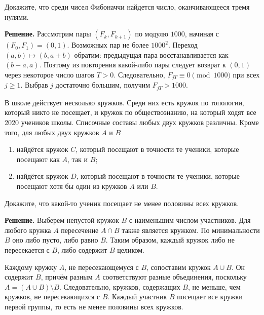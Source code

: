 \begin{problems}
\item Докажите, что среди чисел Фибоначчи найдется число, оканчивающееся тремя нулями.
\par\smallskip\noindent\textbf{Решение.} Рассмотрим пары $(F_k,F_{k+1})$ по модулю $1000$, начиная с $(F_0,F_1)=(0,1)$. Возможных пар не более $1000^2$. Переход $(a,b)\mapsto(b,a+b)$ обратим: предыдущая пара восстанавливается как $(b-a,a)$. Поэтому из повторения какой-либо пары следует возврат к $(0,1)$ через некоторое число шагов $T>0$. Следовательно, $F_{jT}\equiv0\pmod{1000}$ при всех $j\ge1$. Выбрав $j$ достаточно большим, получим $F_{jT}>1000$.\par

\item В школе действует несколько кружков. Среди них есть кружок по топологии, который никто не посещает, и кружок по обществознанию, на который ходят все 2020 учеников школы. Списочные составы любых двух кружков различны. Кроме того, для любых двух кружков $A$ и $B$
\begin{enumerate}[label=\arabic*)]
  \item найдётся кружок $C$, который посещают в точности те ученики, которые посещают как $A$, так и $B$;
  \item найдётся кружок $D$, который посещают в точности те ученики, которые посещают хотя бы один из кружков $A$ или $B$.
\end{enumerate}
Докажите, что какой-то ученик посещает не менее половины всех кружков.
\par\smallskip\noindent\textbf{Решение.} Выберем непустой кружок $B$ с наименьшим числом участников. Для любого кружка $A$ пересечение $A\cap B$ также является кружком. По минимальности $B$ оно либо пусто, либо равно $B$. Таким образом, каждый кружок либо не пересекается с $B$, либо содержит $B$ целиком.
\par Каждому кружку $A$, не пересекающемуся с $B$, сопоставим кружок $A\cup B$. Он содержит $B$, причём разным $A$ соответствуют разные объединения, поскольку $A=(A\cup B)\setminus B$. Следовательно, кружков, содержащих $B$, не меньше, чем кружков, не пересекающихся с $B$. Каждый участник $B$ посещает все кружки первой группы, то есть не менее половины всех кружков.\par


\end{problems}
